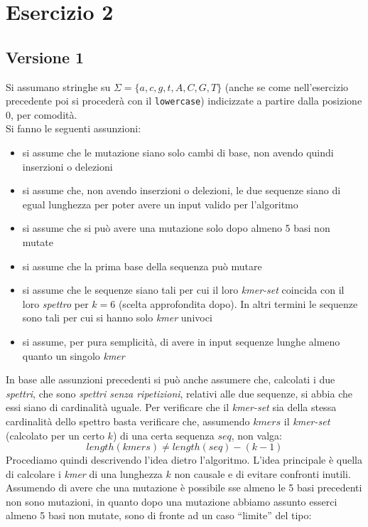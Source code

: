 \documentclass[a4paper,12pt, oneside]{book}
\begin{document}
\chapter{Esercizio 2}
\section{Versione 1}
Si assumano stringhe su $\Sigma=\{a,c,g,t,A,C,G,T\}$ (anche se come
nell'esercizio precedente poi si procederà con il \texttt{lowercase})
indicizzate a partire dalla posizione 0, per comodità.\\
Si fanno le seguenti assunzioni:
\begin{itemize}
  \item si assume che le mutazione siano solo cambi di base, non avendo quindi
  inserzioni o delezioni
  \item si assume che, non avendo inserzioni o delezioni, le due sequenze siano
  di egual lunghezza per poter avere un input valido per l'algoritmo
  \item si assume che si può avere una mutazione solo dopo almeno 5 basi non
  mutate 
  \item si assume che la prima base della sequenza può mutare
  \item si assume che le sequenze siano tali per cui il loro \textit{kmer-set}
  coincida con il loro \textit{spettro} per $k=6$ (scelta approfondita dopo). In
  altri termini le sequenze 
  sono tali per cui si hanno solo \textit{kmer} univoci
  \item si assume, per pura semplicità, di avere in input sequenze lunghe almeno
  quanto un singolo \textit{kmer}
\end{itemize}
In base alle assunzioni precedenti si può anche assumere che, calcolati i due
\textit{spettri}, che sono \textit{spettri senza ripetizioni}, relativi alle due
sequenze, si abbia che essi siano di cardinalità uguale. Per verificare che il
\textit{kmer-set} sia della stessa cardinalità dello spettro basta verificare
che, assumendo $kmers$ il \textit{kmer-set} (calcolato per un certo $k$) di una
certa sequenza $seq$, non valga: 
\[length(kmers) \neq length(seq)-(k-1)\]
Procediamo quindi descrivendo l'idea dietro l'algoritmo. L'idea principale è
quella di calcolare i \textit{kmer} di una lunghezza $k$ non causale e di
evitare confronti inutili. Assumendo di avere che una mutazione è possibile sse
almeno le 5 basi precedenti non sono mutazioni, in quanto dopo una mutazione
abbiamo assunto esserci almeno 5 basi non mutate, sono di fronte ad un caso
``limite'' del tipo:
\end{document}
